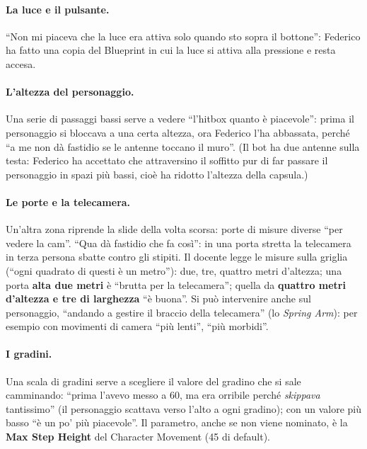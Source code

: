 \paragraph{La luce e il pulsante.} ``Non mi piaceva che la luce era attiva solo quando sto
sopra il bottone'': Federico ha fatto una copia del Blueprint in cui la luce si attiva
alla pressione e resta accesa.

\paragraph{L'altezza del personaggio.} Una serie di passaggi bassi serve a vedere ``l'hitbox
quanto è piacevole'': prima il personaggio si bloccava a una certa altezza, ora Federico
l'ha abbassata, perché ``a me non dà fastidio se le antenne toccano il muro''. (Il bot ha
due antenne sulla testa: Federico ha accettato che attraversino il soffitto pur di far
passare il personaggio in spazi più bassi, cioè ha ridotto l'altezza della capsula.)

\paragraph{Le porte e la telecamera.} Un'altra zona riprende la slide della volta scorsa:
porte di misure diverse ``per vedere la cam''. ``Qua dà fastidio che fa così'': in una porta
stretta la telecamera in terza persona sbatte contro gli stipiti. Il docente legge le misure
sulla griglia (``ogni quadrato di questi è un metro''): due, tre, quattro metri d'altezza;
una porta \textbf{alta due metri} è ``brutta per la telecamera''; quella da \textbf{quattro
metri d'altezza e tre di larghezza} ``è buona''. Si può intervenire anche sul personaggio,
``andando a gestire il braccio della telecamera'' (lo \emph{Spring Arm}): per esempio con
movimenti di camera ``più lenti'', ``più morbidi''.

\paragraph{I gradini.} Una scala di gradini serve a scegliere il valore del gradino che si
sale camminando: ``prima l'avevo messo a 60, ma era orribile perché \emph{skippava}
tantissimo'' (il personaggio scattava verso l'alto a ogni gradino); con un valore più basso
``è un po' più piacevole''. Il parametro, anche se non viene nominato, è la \textbf{Max Step
Height} del Character Movement (45 di default).

